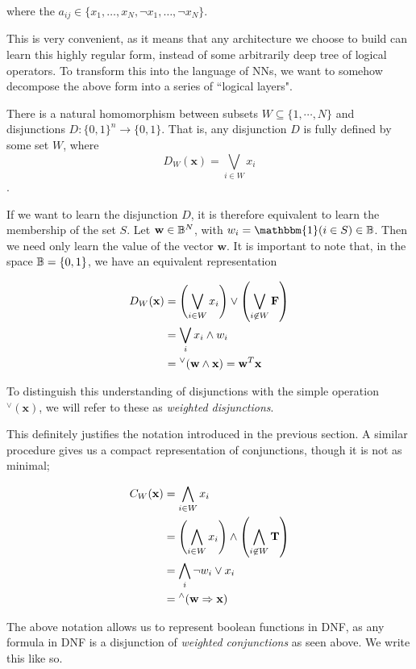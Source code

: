where the $a_{ij} \in \{x_1, \dots, x_N, \lnot x_1, \dots, \lnot x_N\}$.

This is very convenient, as it means that any architecture we choose to build can learn this highly regular form, instead of some arbitrarily deep tree of logical operators. To transform this into the language of NNs, we want to somehow decompose the above form into a series of ``logical layers". 

There is a natural homomorphism between subsets $W \subseteq \{1, \cdots, N\}$ and disjunctions $D : \{0,1\}^n \to \{0,1\}$. That is, any disjunction $D$ is fully defined by some set $W$, where
$$D_W(\mathbf{x}) = \bigvee_{i\in W} x_i$$.

If we want to learn the disjunction $D$, it is therefore equivalent to learn the membership of the set $S$. Let $\mathbf{w} \in \mathbb{B}^N$, with $w_i = \mathbbm{1}(i \in S) \in \B$. Then we need only learn the value of the vector $\mathbf{w}$. It is important to note that, in the space $\mathbb{B} = \{0,1\}$, we have an equivalent representation

$$
\begin{aligned}
D_W(\mathbf{x}) 
&= \left(\bigvee_{i \in W} x_i\right) \lor \left(\bigvee_{i \not\in W} \textbf{F}\right) \\
&= \bigvee_{i} x_i \land w_i \\
&= {^\lor}(\mathbf{w \land x}) = \mathbf{w}^T\mathbf{x}
\end{aligned}
$$

To distinguish this understanding of disjunctions with the simple operation $^\lor(\mathbf{x})$, we will refer to these as \textit{weighted disjunctions}.

This definitely justifies the notation introduced in the previous section. A similar procedure gives us a compact representation of conjunctions, though it is not as minimal;

$$
\begin{aligned}
C_W(\mathbf{x}) 
&= \bigwedge_{i \in W} x_i \\
&= \left(\bigwedge_{i \in W} x_i\right) \land \left(\bigwedge_{i \not\in W} \textbf{T} \right) \\
&= \bigwedge_i \neg w_i \lor x_i \\
&= {^\land}(\mathbf{w} \Rightarrow \mathbf{x})
\end{aligned}
$$

The above notation allows us to represent boolean functions in DNF, as any formula in DNF is a disjunction of \textit{weighted conjunctions} as seen above. We write this like so.

